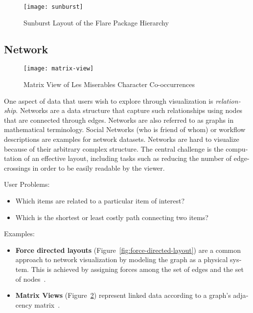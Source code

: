 \begin{english}
\begin{figure}
\centering
\texttt{[image: sunburst]}
\caption{Sunburst Layout of the Flare Package Hierarchy}
\label{fig:sunburst}
\end{figure}


\subsection{Network}

\begin{figure}
\centering
\texttt{[image: matrix-view]}
\caption{Matrix View of Les Miserables Character Co-occurrences}
\label{fig:matrix-view}
\end{figure}

One aspect of data that users wish to explore through visualization is \emph{relationship}. Networks are a data structure that capture such relationships using nodes that are connected through edges. Networks are also referred to as graphs in mathematical terminology. Social Networks (who is friend of whom) or workflow descriptions are examples for network datasets. Networks are hard to visualize because of their arbitrary complex structure. The central challenge is the computation of an effective layout, including tasks such as reducing the number of edge-crossings in order to be easily readable by the viewer.

\SuperPar User Problems:

\begin{itemize}
\item Which items are related to a particular item of interest?
\item Which is the shortest or least costly path connecting two items?
\end{itemize}

\SuperPar Examples:

\begin{itemize}
\item \textbf{Force directed layouts} (Figure~\ref{fig:force-directed-layout}) are a common approach to network visualization by modeling the graph as a physical system. This is achieved by assigning forces among the set of edges and the set of nodes~\cite{Fruchterman91,VisualizationZoo:2010}.
\item \textbf{Matrix Views} (Figure~\ref{fig:matrix-view}) represent linked data according to a graph's adjacency matrix~\cite{Henry:2007,VisualizationZoo:2010}.
\end{itemize}


\end{english}
